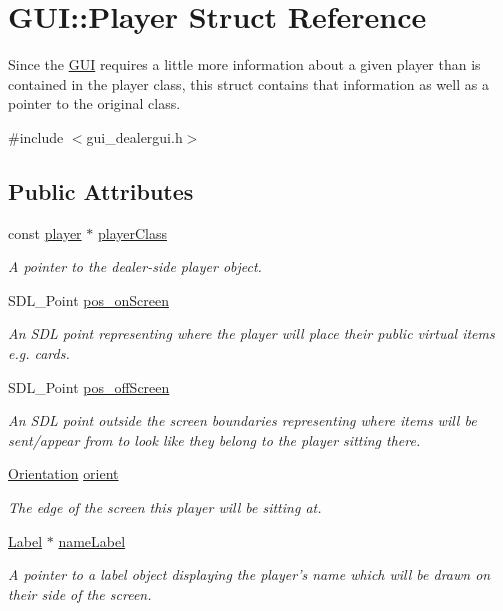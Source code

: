 \hypertarget{structGUI_1_1Player}{\section{G\-U\-I\-:\-:Player Struct Reference}
\label{structGUI_1_1Player}
}


Since the \hyperlink{namespaceGUI}{G\-U\-I} requires a little more information about a given player than is contained in the player class, this struct contains that information as well as a pointer to the original class.  




{\ttfamily \#include $<$gui\-\_\-dealergui.\-h$>$}

\subsection*{Public Attributes}
\begin{DoxyCompactItemize}
\item 
const \hyperlink{classplayer}{player} $\ast$ \hyperlink{structGUI_1_1Player_acadd2cb8c209e871196e90b6945d5d45}{player\-Class}
\begin{DoxyCompactList}\small\item\em A pointer to the dealer-\/side player object. \end{DoxyCompactList}\item 
S\-D\-L\-\_\-\-Point \hyperlink{structGUI_1_1Player_ae17ed358dbf130cd020bbb3db2b71dce}{pos\-\_\-on\-Screen}
\begin{DoxyCompactList}\small\item\em An S\-D\-L point representing where the player will place their public virtual items e.\-g. cards. \end{DoxyCompactList}\item 
S\-D\-L\-\_\-\-Point \hyperlink{structGUI_1_1Player_ab60cdc012c16dab854828c01c413bdaf}{pos\-\_\-off\-Screen}
\begin{DoxyCompactList}\small\item\em An S\-D\-L point outside the screen boundaries representing where items will be sent/appear from to look like they belong to the player sitting there. \end{DoxyCompactList}\item 
\hyperlink{namespaceGUI_a1a3a8094d47f7be06ce123fab38abf6a}{Orientation} \hyperlink{structGUI_1_1Player_ab28696f51c4aae54e89c7b0a3c695255}{orient}
\begin{DoxyCompactList}\small\item\em The edge of the screen this player will be sitting at. \end{DoxyCompactList}\item 
\hyperlink{classGUI_1_1Label}{Label} $\ast$ \hyperlink{structGUI_1_1Player_a9119240f399cbce53b8505938d1b7b70}{name\-Label}
\begin{DoxyCompactList}\small\item\em A pointer to a label object displaying the player's name which will be drawn on their side of the screen. \end{DoxyCompactList}\end{DoxyCompactItemize}


